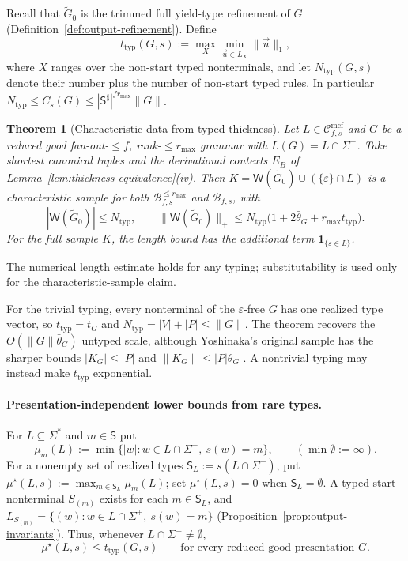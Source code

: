 \documentclass[11pt]{article}
\numberwithin{equation}{section}
\theoremstyle{plain}
\newtheorem{theorem}{Theorem}[section]
\theoremstyle{definition}
\theoremstyle{remark}
\newcommand{\Wit}{\mathsf{W}}
\newcommand{\Cmcf}[2]{\mathcal{C}^{\mathrm{mcf}}_{#1,#2}}
\newcommand{\tuple}[1]{\vec{#1}}
\newcommand{\eps}{\varepsilon}
\theoremstyle{plain}
\begin{document}
Recall that $\widetilde G_0$ is the trimmed full yield-type refinement of $G$
(Definition~\ref{def:output-refinement}).  Define
\[
 t_{\mathrm{typ}}(G,s):=\max_{X}\min_{\tuple u\in L_X}\|\tuple u\|_1,
\]
where $X$ ranges over the non-start typed nonterminals, and let
$N_{\mathrm{typ}}(G,s)$ denote their number plus the number of non-start
typed rules.  In particular $N_{\mathrm{typ}}\le C_s(G)\le
|\mathsf S^\sharp|^{fr_{\max}}\|G\|$.

\begin{theorem}[Characteristic data from typed thickness]
\label{thm:data-from-typed-thickness}
Let $L\in\Cmcf{f}{s}$ and $G$ be a reduced good fan-out-$\le f$,
rank-$\le r_{\max}$ grammar with $L(G)=L\cap\Sigma^+$.
Take shortest canonical tuples and the derivational contexts $E_B$ of
Lemma~\ref{lem:thickness-equivalence}(iv).  Then
$K=\Wit(\widetilde G_0)\cup(\{\eps\}\cap L)$ is a characteristic sample
for both $\mathcal B^{\le r_{\max}}_{f,s}$ and $\mathcal B_{f,s}$, with
\[
 |\Wit(\widetilde G_0)|\le N_{\mathrm{typ}},\qquad
 \|\Wit(\widetilde G_0)\|_+\le
 N_{\mathrm{typ}}\bigl(1+2\bar\theta_G+r_{\max}t_{\mathrm{typ}}\bigr).
\]
For the full sample $K$, the length bound has the additional term
$\mathbf 1_{\{\eps\in L\}}$.
\end{theorem}

The numerical length estimate holds for any typing; substitutability is used
only for the characteristic-sample claim.

For the trivial typing, every nonterminal of the $\eps$-free $G$ has one
realized type vector, so $t_{\mathrm{typ}}=t_G$ and
$N_{\mathrm{typ}}=|V|+|P|\le\|G\|$.  The theorem recovers the
$O(\|G\|\bar\theta_G)$ untyped scale, although Yoshinaka's original
sample has the sharper bounds $|K_G|\le|P|$ and
$\|K_G\|\le|P|\theta_G$ \cite[Lemma~7 and Theorem~1]{Yoshinaka2011}.
A nontrivial typing may instead make $t_{\mathrm{typ}}$ exponential.

\paragraph{Presentation-independent lower bounds from rare types.}
For $L\subseteq\Sigma^*$ and $m\in\mathsf S$ put
\[
 \mu_m(L):=\min\{|w|:w\in L\cap\Sigma^+,\ s(w)=m\},
 \qquad (\min\emptyset:=\infty).
\]
For a nonempty set of realized types $\mathsf S_L:=s(L\cap\Sigma^+)$, put
$\mu^\star(L,s):=\max_{m\in \mathsf S_L}\mu_m(L)$; set
$\mu^\star(L,s)=0$ when $\mathsf S_L=\emptyset$.  A typed start nonterminal
$S_{(m)}$ exists for each $m\in \mathsf S_L$, and
$L_{S_{(m)}}=\{(w):w\in L\cap\Sigma^+,\ s(w)=m\}$
(Proposition~\ref{prop:output-invariants}). Thus, whenever
$L\cap\Sigma^+\ne\emptyset$,
\begin{equation}\label{eq:root-thickness}
 \mu^\star(L,s)\le t_{\mathrm{typ}}(G,s)
 \qquad\text{for every reduced good presentation }G.
\end{equation}
\end{document}
